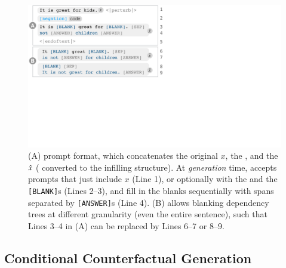 \begin{figure}[t]
\centering
\includegraphics[trim={0 18.6cm 31.5cm 0cm}, clip, width=1\columnwidth]{figures/blank.pdf}
\vspace{-15pt}
\caption{ 
(A) \sysname prompt format, which concatenates the original $x$, the \tagstr, and the $\hat{x}$ ( converted to the infilling structure).
At \emph{generation} time, \sysname accepts prompts that just include $x$ (Line 1), or optionally with the \tagstrshort and the \texttt{[BLANK]}s (Lines 2--3), and fill in the blanks sequentially with spans separated by \texttt{[ANSWER]}s (Line 4).
(B) \sysname allows blanking dependency trees at different granularity (even the entire sentence), such that Lines 3--4 in (A) can be replaced by Lines 6--7 or 8--9. 
}
\vspace{-10pt}
\label{fig:blank}
\end{figure}


\subsection{Conditional Counterfactual Generation}
\label{subsec:nlg}


\TagTable

